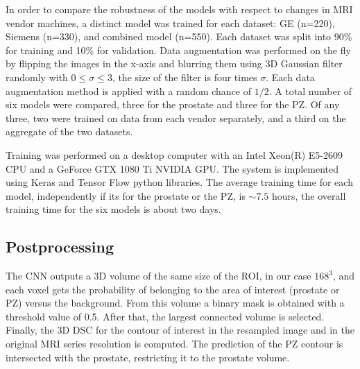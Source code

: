 In order to compare the robustness of the models with respect to changes in MRI vendor machines,  a distinct model was trained for each dataset: GE (n=220), Siemens (n=330), and combined model (n=550). Each dataset was split into 90\% for training and 10\% for validation. Data augmentation was performed on the fly by flipping the images in the x-axis and blurring them using 3D Gaussian filter randomly with $0 \leq \sigma \leq 3$, the size of the filter is four times  $\sigma$. Each data augmentation method is applied with a random chance of $1/2$.  
A total number of six models were compared, three for the prostate and three for the PZ. Of any three, two were trained on data from each vendor separately, and a third on the aggregate of the two datasets.

Training was performed on a desktop computer with an Intel Xeon(R) E5-2609 CPU and a GeForce GTX 1080 Ti NVIDIA GPU. The system is implemented using Keras \cite{chollet2015} and Tensor Flow \cite{abadi2016tensorflow} python libraries. The average training time for each model, independently if its for the prostate or the PZ, is $\sim 7.5$ hours, the overall training time for the six models is about two days.


\subsection{Postprocessing}
The CNN outputs a 3D volume of the same size of the ROI, in our case $168^3$, and each voxel gets the probability of belonging to the area of interest (prostate or PZ) versus the background. From this volume a binary mask is obtained with a threshold value of 0.5. After that, the largest connected volume is selected. Finally, the 3D DSC for the contour of interest in the resampled image and in the original MRI series resolution is computed. The prediction of the PZ contour is intersected with the prostate, restricting it to the prostate volume.